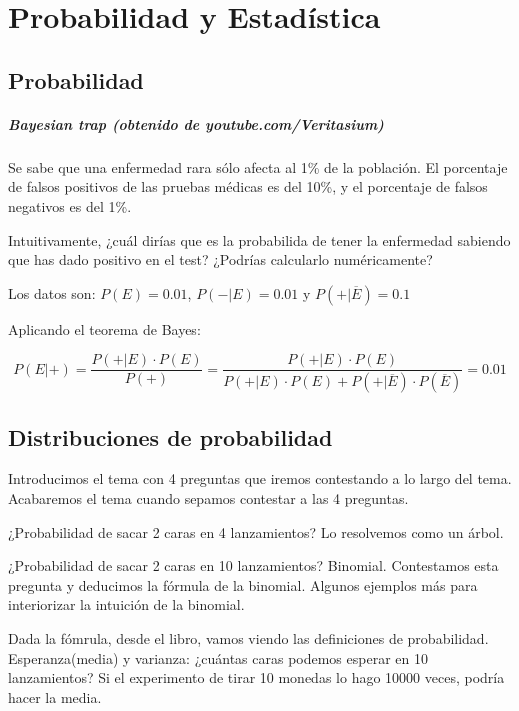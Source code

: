 \chapter{Probabilidad y Estadística}

\section{Probabilidad}


\paragraph{Bayesian trap (obtenido de youtube.com/Veritasium)}

\begin{example}
Se sabe que una enfermedad rara sólo afecta al 1\% de la población. 
%
El porcentaje de falsos positivos de las pruebas médicas es del 10\%, y el porcentaje de falsos negativos es del 1\%.

Intuitivamente, ¿cuál dirías que es la probabilida de tener la enfermedad sabiendo que has dado positivo en el test? ¿Podrías calcularlo numéricamente?

Los datos son: $P(E) = 0.01$, $P(-|E) = 0.01$ y $P(+|\overline{E})=0.1$

Aplicando el teorema de Bayes:

\[P(E|+) = \frac{P(+|E)·P(E)}{P(+)} = \frac{P(+|E)·P(E)}{P(+|E)·P(E) + P(+|\overline{E})·P(\overline{E})}= 0.01 \]
\end{example}

\section{Distribuciones de probabilidad}

Introducimos el tema con 4 preguntas que iremos contestando a lo largo del tema. Acabaremos el tema cuando sepamos contestar a las 4 preguntas.

¿Probabilidad de sacar 2 caras en 4 lanzamientos? Lo resolvemos como un árbol.

¿Probabilidad de sacar 2 caras en 10 lanzamientos? Binomial. Contestamos esta pregunta y deducimos la fórmula de la binomial. Algunos ejemplos más para interiorizar la intuición de la binomial.



Dada la fómrula, desde el libro, vamos viendo las definiciones de probabilidad. Esperanza(media) y varianza: ¿cuántas caras podemos esperar en 10 lanzamientos? Si el experimento de tirar 10 monedas lo hago 10000 veces, podría hacer la media. 

